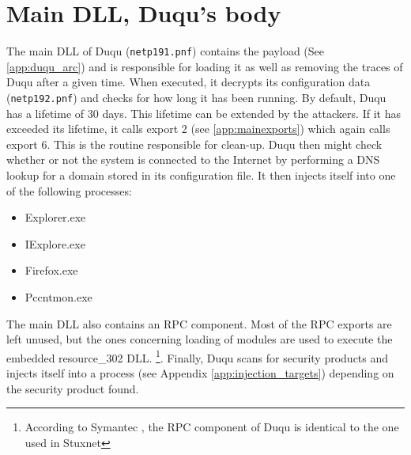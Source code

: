 \documentclass[11pt,english,a4paper]{report}
\begin{document}
\section{Main DLL, Duqu's body}
The main DLL of Duqu (\texttt{netp191.pnf}) contains the payload (See \ref{app:duqu_arc}) and is responsible for loading it as well as removing the traces of Duqu after a given time. When executed, it decrypts its configuration data (\texttt{netp192.pnf}) and checks for how long it has been running. By default, Duqu has a lifetime of 30 days. This lifetime can be extended by the attackers. If it has exceeded its lifetime, it calls export 2 (see \ref{app:mainexports}) which again calls export 6. This is the routine responsible for clean-up. Duqu then might check whether or not the system is connected to the Internet by performing a DNS lookup for a domain stored in its configuration file. It then injects itself into one of the following processes:
 \begin{itemize}
   \item Explorer.exe
   \item IExplore.exe
   \item Firefox.exe
   \item Pccntmon.exe
  \end{itemize}
The main DLL also contains an RPC component. Most of the RPC exports are left unused, but the ones concerning loading of modules are used to execute the embedded resource\_302 DLL. \footnote{ According to Symantec \cite{DUQU_SYMANTEC}, the RPC component of Duqu is identical to the one used in Stuxnet}. Finally, Duqu scans for security products and injects itself into a process (see Appendix \ref{app:injection_targets}) depending on the security product found. 
\end{document}
